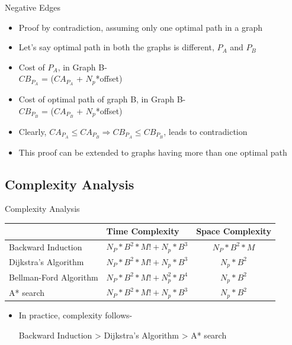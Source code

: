 \documentclass{beamer}
\makeatletter
\newcounter{multipleslide}
\newcommand{\restoreframe}
{
	\patchcmd{\beamer@@tmpl@footline}
	{\themultipleslide}
  	{\insertframenumber}
	{}
	{}
	\setcounter{framenumber}{\value{multipleslide}}
}
\makeatother
\begin{document}
\begin{frame}{Negative Edges}
\begin{itemize}
\item Proof by contradiction, assuming only one optimal path in a graph
\item Let's say optimal path in both the graphs is different, $P_A$ and $P_B$
\item Cost of $P_A$, in Graph B-\\
\hspace*{1cm} $CB_{P_A}$ = ($CA_{P_A}$ + $N_p$*offset)
\item Cost of optimal path of graph B, in Graph B-\\
\hspace*{1cm} $CB_{P_B}$ = ($CA_{P_B}$ + $N_p$*offset)
\item Clearly, $CA_{P_A} \leq CA_{P_B}  \Rightarrow  CB_{P_A} \leq CB_{P_B}$, leads to contradiction
\item This proof can be extended to graphs having more than one optimal path
\end{itemize}
\end{frame}
\restoreframe

\subsection{Complexity Analysis}
\begin{frame}{Complexity Analysis}
\begin{table}
\begin{tabular}{|p{2.5cm}|p{4cm}|c|}
\hline 
 & \textbf{Time Complexity} & \textbf{Space Complexity} \\ 
\hline 
Backward Induction & $N_P*B^{2}*M! + N_p*B^3$ & $N_P*B^{2}*M$ \\ 
\hline 
Dijkstra's Algorithm & $N_P*B^{2}*M! + N_p*B^3$ & $N_p*B^2$ \\ 
\hline 
Bellman-Ford Algorithm & $N_P*B^{2}*M! + N_p^2*B^4$ & $N_p*B^2$ \\ 
\hline 
A* search & $N_P*B^{2}*M! + N_p*B^3$ & $N_p*B^2$ \\ 
\hline 
\end{tabular} 
\end{table}
\begin{itemize}
\item In practice, complexity follows-
\begin{center}
Backward Induction > Dijkstra's Algorithm > A* search
\end{center}
\end{itemize}
\end{frame}
\end{document}
